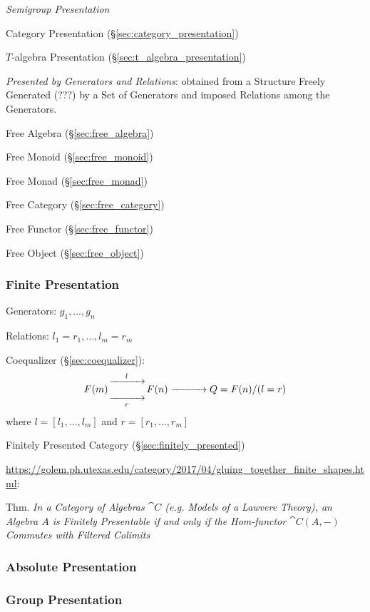 \emph{Semigroup Presentation}

Category Presentation (\S\ref{sec:category_presentation})

$T$-algebra Presentation (\S\ref{sec:t_algebra_presentation})

\emph{Presented by Generators and Relations}: obtained from a
Structure Freely Generated (???) by a Set of Generators and imposed
Relations among the Generators.

Free Algebra (\S\ref{sec:free_algebra})

Free Monoid (\S\ref{sec:free_monoid})

Free Monad (\S\ref{sec:free_monad})

Free Category (\S\ref{sec:free_category})

Free Functor (\S\ref{sec:free_functor})

Free Object (\S\ref{sec:free_object})



\subsubsection{Finite Presentation}\label{sec:finite_presentation}
\cite{awodey06}

Generators: $g_1, \ldots, g_n$

Relations: $l_1 = r_1, \ldots, l_m = r_m$

Coequalizer (\S\ref{sec:coequalizer}):
\[
  F(m) {\xrightarrow[\quad\quad\quad]{l}
    \atop \xrightarrow[r]{\quad\quad\quad}} F(n)
  \xrightarrow{\quad\quad\quad} Q = F(n) / (l = r)
\]
where $l = [l_1, \ldots, l_m]$ and $r = [r_1, \ldots, r_m]$

Finitely Presented Category (\S\ref{sec:finitely_presented})

\url{https://golem.ph.utexas.edu/category/2017/04/gluing_together_finite_shapes.html}:

Thm. \emph{In a Category of Algebras $\cat{C}$ (e.g. Models of a
  Lawvere Theory), an Algebra $A$ is Finitely Presentable if and only
  if the Hom-functor $\cat{C}(A,-)$ Commutes with Filtered Colimits}



\subsubsection{Absolute Presentation}\label{sec:absolute_presentation}

\subsubsection{Group Presentation}\label{sec:group_presentation}

